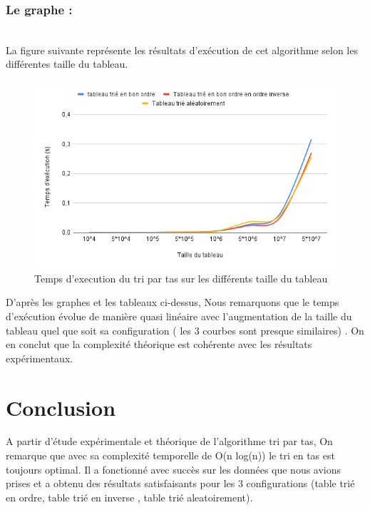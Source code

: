 \subsubsection{Le graphe :}
\\
La figure suivante représente les résultats d'exécution de cet algorithme selon les différentes taille du tableau.

\begin{figure}[H]
    \centering
        \includegraphics[scale=0.7]{ressources/heapchart.png}
        \caption{Temps d'execution du tri par tas sur les différents taille du tableau }
    \label{fig:insertch}
\end{figure}
\par
\par
D’après les graphes et les tableaux ci-dessus, Nous remarquons que le temps d’exécution évolue de manière quasi linéaire avec l’augmentation de la taille du tableau quel que soit sa configuration ( les 3 courbes sont presque  similaires) .
On en conclut que la complexité théorique est cohérente avec les résultats expérimentaux.

\section{Conclusion}
A partir d'étude expérimentale et théorique de l'algorithme tri par tas, On remarque que avec sa complexité temporelle de O(n log(n)) le tri en tas est toujours optimal. Il  a fonctionné avec succès sur les données  que nous avions prises et a obtenu des résultats satisfaisants pour les 3 configurations (table trié en ordre, table trié en inverse , table trié aleatoirement). 